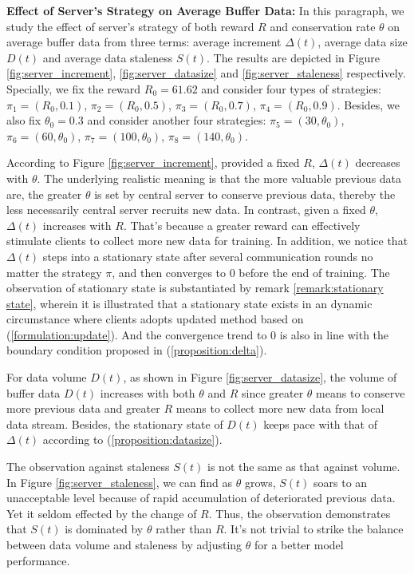 \documentclass{article}
\theoremstyle{plain}
\theoremstyle{definition}
\theoremstyle{remark}
\begin{document}
\textbf{Effect of Server's Strategy on Average Buffer Data: }
In this paragraph, we study the effect of server's strategy of both reward $R$ and conservation rate $\theta$ on average buffer data from three terms: average increment $\Delta(t)$, average data size $D(t)$ and average data staleness $S(t)$. The results are depicted in Figure \ref{fig:server_increment}, \ref{fig:server_datasize} and \ref{fig:server_staleness} respectively.
Specially, we fix the reward $R_0=61.62$ and consider four types of strategies: $\pi_1=(R_0, 0.1)$, $\pi_2=(R_0, 0.5)$, $\pi_3=(R_0, 0.7)$, $\pi_4=(R_0, 0.9)$. Besides, we also fix $\theta_0=0.3$ and consider another four strategies: $\pi_5=(30, \theta_0)$, $\pi_6=(60, \theta_0)$, $\pi_7=(100, \theta_0)$, $\pi_8=(140, \theta_0)$.

According to Figure \ref{fig:server_increment}, provided a fixed $R$, $\Delta(t)$ decreases with $\theta$. The underlying realistic meaning is that the more valuable previous data are, the greater $\theta$ is set by central server to conserve previous data, thereby the less necessarily central server recruits new data.
In contrast, given a fixed $\theta$, $\Delta(t)$ increases with $R$. That's because a greater reward can effectively stimulate clients to collect more new data for training.
In addition, we notice that $\Delta(t)$ steps into a stationary state after several communication rounds no matter the strategy $\pi$, and then converges to $0$ before the end of training.
The observation of stationary state is substantiated by remark \ref{remark:stationary state}, wherein it is illustrated that a stationary state exists in an dynamic circumstance where clients adopts updated method based on (\ref{formulation:update}).
And the convergence trend to $0$ is also in line with the boundary condition proposed in (\ref{proposition:delta}).

For data volume $D(t)$, as shown in Figure \ref{fig:server_datasize}, the volume of buffer data $D(t)$ increases with both $\theta$ and $R$ since greater $\theta$ means to conserve more previous data and greater $R$ means to collect more new data from local data stream.
Besides, the stationary state of $D(t)$ keeps pace with that of $\Delta(t)$ according to (\ref{proposition:datasize}).

The observation against staleness $S(t)$ is not the same as that against volume. In Figure \ref{fig:server_staleness}, we can find as $\theta$ grows, $S(t)$ soars to an unacceptable level because of rapid accumulation of deteriorated previous data. Yet it seldom effected by the change of $R$. Thus, the observation demonstrates that $S(t)$ is dominated by $\theta$ rather than $R$. It's not trivial to strike the balance between data volume and staleness by adjusting $\theta$ for a better model performance. 
\end{document}
